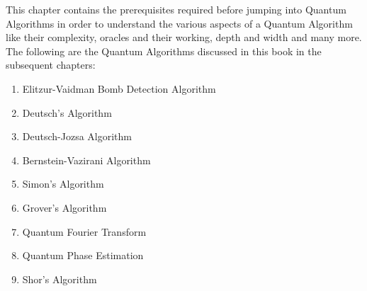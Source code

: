 \documentclass[12pt, oneside]{book}
\theoremstyle{definition}
\theoremstyle{definition}
\theoremstyle{remark}
\begin{document}
This chapter contains the prerequisites required before jumping into Quantum Algorithms in order to understand the various aspects of a Quantum Algorithm like their complexity, oracles and their working, depth and width and many more.
The following are the Quantum Algorithms discussed in this book in the subsequent chapters:
\begin{enumerate}
    \item Elitzur-Vaidman Bomb Detection Algorithm
    \item Deutsch's Algorithm
    \item Deutsch-Jozsa Algorithm
    \item Bernstein-Vazirani Algorithm
    \item Simon's Algorithm
    \item Grover's Algorithm
    \item Quantum Fourier Transform
    \item Quantum Phase Estimation
    \item Shor's Algorithm
\end{enumerate}
\end{document}
